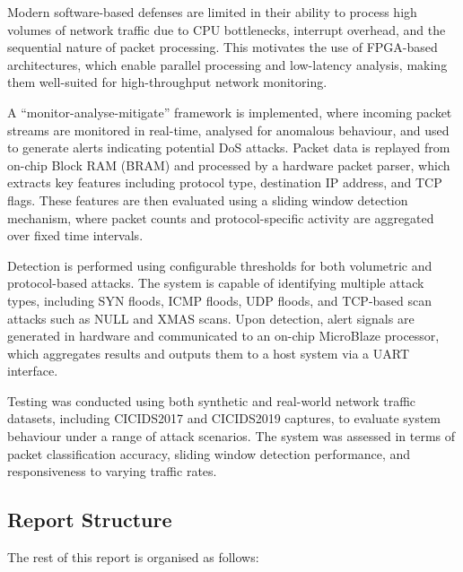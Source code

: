Modern software-based defenses are limited in their ability to process high volumes of network traffic due to CPU bottlenecks, interrupt overhead, and the sequential nature of packet processing. This motivates the use of FPGA-based architectures, which enable parallel processing and low-latency analysis, making them well-suited for high-throughput network monitoring.

A ``monitor-analyse-mitigate'' framework is implemented, where incoming packet streams are monitored in real-time, analysed for anomalous behaviour, and used to generate alerts indicating potential DoS attacks. Packet data is replayed from on-chip Block RAM (BRAM) and processed by a hardware packet parser, which extracts key features including protocol type, destination IP address, and TCP flags. These features are then evaluated using a sliding window detection mechanism, where packet counts and protocol-specific activity are aggregated over fixed time intervals.

Detection is performed using configurable thresholds for both volumetric and protocol-based attacks. The system is capable of identifying multiple attack types, including SYN floods, ICMP floods, UDP floods, and TCP-based scan attacks such as NULL and XMAS scans. Upon detection, alert signals are generated in hardware and communicated to an on-chip MicroBlaze processor, which aggregates results and outputs them to a host system via a UART interface.

Testing was conducted using both synthetic and real-world network traffic datasets, including CICIDS2017 and CICIDS2019 captures, to evaluate system behaviour under a range of attack scenarios. The system was assessed in terms of packet classification accuracy, sliding window detection performance, and responsiveness to varying traffic rates.

\subsection{Report Structure}
\noindent The rest of this report is organised as follows:

